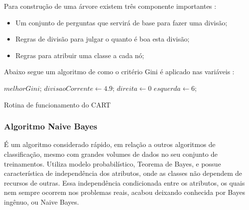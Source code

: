 Para construção de uma árvore existem três componente importantes \cite{yohannes1999classification}: 
\begin{itemize}
[noitemsep]
 \item Um conjunto de perguntas que servirá de base para fazer uma divisão;
 \item Regras de divisão para julgar o quanto é boa esta divisão;
 \item Regras para atribuir uma classe a cada nó;
\end{itemize}

Abaixo segue um algoritmo de como o critério Gini é aplicado nas variáveis \cite{Raimundo2008}:

\IncMargin{1em}
\begin{algorithm}[h]

\nl $melhorGini$; 
\nl $divisaoCorrente \leftarrow 4.9$; 
\nl $direita \leftarrow 0$\; 
\nl $esquerda \leftarrow 6$; 
\nl {}
 \caption{Rotina de funcionamento do CART}\label{alg:gini}
 
\end{algorithm}
\DecMargin{1em}


\subsubsection{Algoritmo Naive Bayes}\label{cap:refTeor:sssec:nbayes}
É um algoritmo considerado rápido, em relação a outros algoritmos de classificação, mesmo com grandes volumes de dados no seu conjunto de treinamentos. Utiliza modelo probabilístico, Teorema de Bayes, e possue característica de independência dos atributos, onde as classes não dependem de recursos de outras. Essa independência condicionada  entre os atributos, os quais nem sempre ocorrem nos problemas reais, acabou deixando conhecida por Bayes ingênuo, ou Naive Bayes.

